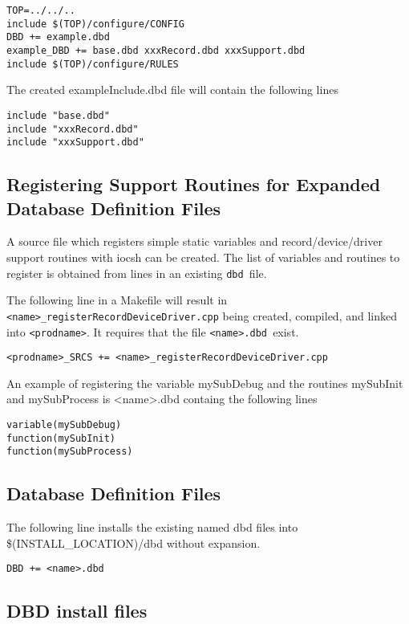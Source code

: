 \begin{verbatim}TOP=../../..
include $(TOP)/configure/CONFIG
DBD += example.dbd
example_DBD += base.dbd xxxRecord.dbd xxxSupport.dbd
include $(TOP)/configure/RULES
\end{verbatim}The created exampleInclude.dbd file will contain the following lines

\begin{verbatim}include "base.dbd"
include "xxxRecord.dbd"
include "xxxSupport.dbd"
\end{verbatim}\subsection{Registering Support Routines for Expanded Database Definition Files}

A source file which registers simple static variables and record/device/driver support routines with iocsh can be created. 
The list of variables and routines to register is obtained from lines in an existing \verb|dbd |file.

The following line in a Makefile will result in \verb|<name>_registerRecordDeviceDriver.cpp| being created, 
compiled, and linked into \verb|<prodname>|. It requires that the file \verb|<name>.dbd |exist.

\begin{verbatim}<prodname>_SRCS += <name>_registerRecordDeviceDriver.cpp
\end{verbatim}An example of registering the variable mySubDebug and the routines mySubInit and mySubProcess is \textless{}name\textgreater{}.dbd 
containg the following lines

\begin{verbatim}variable(mySubDebug)
function(mySubInit)
function(mySubProcess)
\end{verbatim}\subsection{Database Definition Files}

The following line installs the existing named dbd files into \$(INSTALL\_LOCATION)/dbd without expansion.

\begin{verbatim}DBD += <name>.dbd
\end{verbatim}\subsection{DBD install files}

